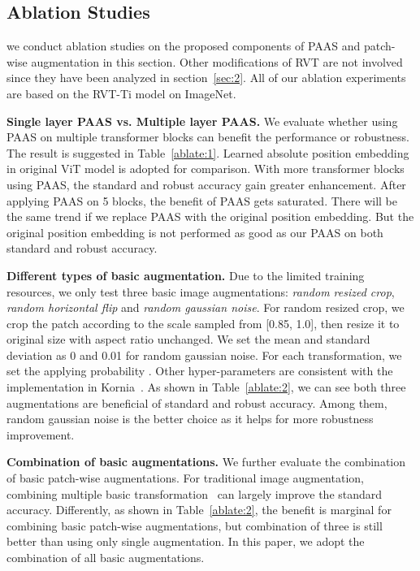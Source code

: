 \documentclass[10pt,twocolumn,letterpaper]{article}
\begin{document}
\subsection{Ablation Studies}
\label{sec:5.4}
we conduct ablation studies on the proposed components of PAAS and patch-wise augmentation in this section. Other modifications of RVT are not involved since they have been analyzed in section~\ref{sec:2}. All of our ablation experiments are based on the RVT-Ti model on ImageNet.





\textbf{Single layer PAAS vs. Multiple layer PAAS.} We evaluate whether using PAAS on multiple transformer blocks can benefit the performance or robustness. The result is suggested in Table~\ref{ablate:1}. Learned absolute position embedding in original ViT model is adopted for comparison. With more transformer blocks using PAAS, the standard and robust accuracy gain greater enhancement. After applying PAAS on 5 blocks, the benefit of PAAS gets saturated. There will be the same trend if we replace PAAS with the original position embedding. But the original position embedding is not performed as good as our PAAS on both standard and robust accuracy.

\textbf{Different types of basic augmentation.} Due to the limited training resources, we only test three basic image augmentations: \emph{random resized crop}, \emph{random horizontal flip} and \emph{random gaussian noise}. For random resized crop, we crop the patch according to the scale sampled from [0.85, 1.0], then resize it to original size with aspect ratio unchanged. We set the mean and standard deviation as 0 and 0.01 for random gaussian noise. For each transformation, we set the applying probability . Other hyper-parameters are consistent with the implementation in Kornia~\cite{eriba2019kornia}. As shown in Table~\ref{ablate:2}, we can see both three augmentations are beneficial of 
standard and robust accuracy. Among them, random gaussian noise is the better choice as it helps for more robustness improvement.

\textbf{Combination of basic augmentations.} We further evaluate the combination of basic patch-wise augmentations. For traditional image augmentation, combining multiple basic transformation~\cite{cubuk2020randaugment} can largely improve the standard accuracy. Differently, as shown in Table~\ref{ablate:2}, the benefit is marginal for combining basic patch-wise augmentations, but combination of three is still better than using only single augmentation. In this paper, we adopt the combination of all basic augmentations.
\end{document}

